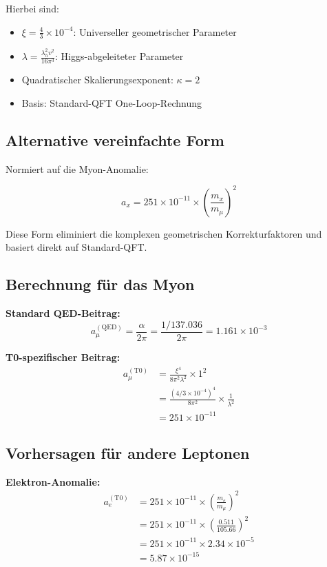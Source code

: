 \documentclass[12pt,a4paper]{article}
\begin{document}
	Hierbei sind:
	\begin{itemize}
		\item $\xi = \frac{4}{3} \times 10^{-4}$: Universeller geometrischer Parameter
		\item $\lambda = \frac{\lambda_h^2 v^2}{16\pi^3}$: Higgs-abgeleiteter Parameter
		\item Quadratischer Skalierungsexponent: $\kappa = 2$
		\item Basis: Standard-QFT One-Loop-Rechnung
	\end{itemize}
	
	\subsection{Alternative vereinfachte Form}
	
	Normiert auf die Myon-Anomalie:
	
	\begin{equation}
		\boxed{a_x = 251 \times 10^{-11} \times \left(\frac{m_x}{m_\mu}\right)^2}
	\end{equation}
	
	Diese Form eliminiert die komplexen geometrischen Korrekturfaktoren und basiert direkt auf Standard-QFT.
	
	\subsection{Berechnung für das Myon}
	
	\textbf{Standard QED-Beitrag:}
	\begin{equation}
		a_\mu^{(\text{QED})} = \frac{\alpha}{2\pi} = \frac{1/137.036}{2\pi} = 1.161 \times 10^{-3}
	\end{equation}
	
	\textbf{T0-spezifischer Beitrag:}
	\begin{align}
		a_\mu^{(\text{T0})} &= \frac{\xi^4}{8\pi^2 \lambda^2} \times 1^2 \\
		&= \frac{(4/3 \times 10^{-4})^4}{8\pi^2} \times \frac{1}{\lambda^2} \\
		&= 251 \times 10^{-11}
	\end{align}
	
	\subsection{Vorhersagen für andere Leptonen}
	
	\textbf{Elektron-Anomalie:}
	\begin{align}
		a_e^{(\text{T0})} &= 251 \times 10^{-11} \times \left(\frac{m_e}{m_\mu}\right)^2 \\
		&= 251 \times 10^{-11} \times \left(\frac{0.511}{105.66}\right)^2 \\
		&= 251 \times 10^{-11} \times 2.34 \times 10^{-5} \\
		&= 5.87 \times 10^{-15}
	\end{align}
	
\end{document}
